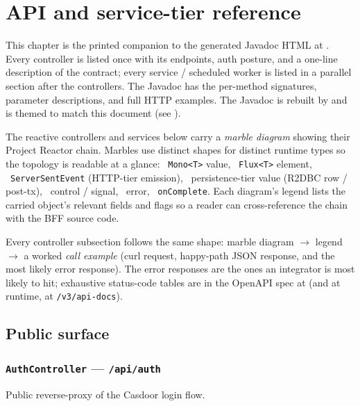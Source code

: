 \chapter{API and service-tier reference}\label{ch:api}

This chapter is the printed companion to the generated Javadoc HTML at
. Every controller is
listed once with its endpoints, auth posture, and a one-line description
of the contract; every service / scheduled worker is listed in a
parallel section after the controllers. The Javadoc has the
per-method signatures, parameter descriptions, and full HTTP examples.
The Javadoc is rebuilt by  and is
themed to match this document (see
).

\bigskip

The reactive controllers and services below carry a \emph{marble
diagram} showing their Project Reactor chain. Marbles use distinct
shapes for distinct runtime types so the topology is readable at a
glance:
~\texttt{Mono<T>} value,
~\texttt{Flux<T>} element,
~\texttt{ServerSentEvent} (HTTP-tier emission),
~persistence-tier value (R2DBC row / post-tx),
~control / signal,
~error,
~\texttt{onComplete}. Each diagram's legend
lists the carried object's relevant fields and flags so a reader can
cross-reference the chain with the BFF source code.

\medskip

Every controller subsection follows the same shape: marble diagram
$\rightarrow$ legend $\rightarrow$ a worked \emph{call example} (curl
request, happy-path JSON response, and the most likely error response).
The error responses are the ones an integrator is most likely to hit;
exhaustive status-code tables are in the OpenAPI spec at
 (and at
runtime, at \texttt{/v3/api-docs}).

\section{Public surface}

\subsection{\texttt{AuthController} — \texttt{/api/auth}}
Public reverse-proxy of the Casdoor login flow.

